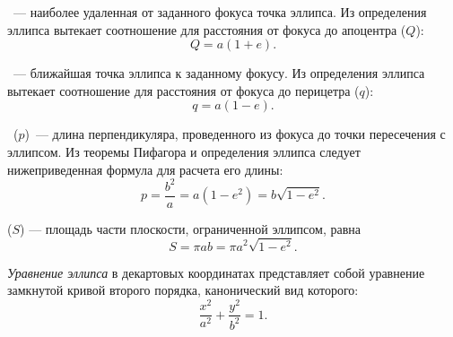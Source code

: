 ~--- наиболее удаленная
от заданного фокуса точка эллипса. Из определения эллипса
вытекает соотношение для расстояния от фокуса до
апоцентра ($Q$):
\begin{equation}
	Q = a (1 + e).
\end{equation}

~--- ближайшая
точка эллипса к заданному фокусу. Из определения эллипса
вытекает соотношение для расстояния от фокуса до
перицетра ($q$):
\begin{equation}
	q = a (1 - e).
\end{equation}

~($p$)~--- длина перпендикуляра,
проведенного из фокуса до точки пересечения с эллипсом.
Из теоремы Пифагора и определения эллипса следует
нижеприведенная формула для расчета его длины:
\begin{equation}
	p=\frac{b^2}{a}=a(1-e^2)=b\sqrt{1-e^2}.
\end{equation}

 ($S$) --- площадь части
плоскости, ограниченной эллипсом, равна
\begin{equation}
	S = \pi ab = \pi a^2 \sqrt{1-e^2}.
\end{equation}


{\itshape Уравнение эллипса} в декартовых координатах
представляет собой уравнение замкнутой кривой второго
порядка, канонический вид которого:
\begin{equation}
	\frac{x^2}{a^2}+\frac{y^2}{b^2}=1.
\end{equation}

